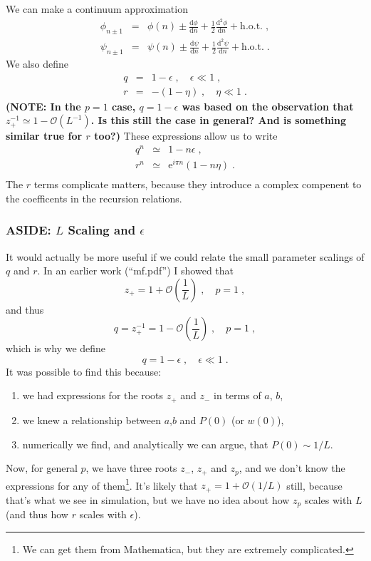 \documentclass[a4paper,10pt]{article}
\newcommand{\D}{\mathrm{d}}
\newcommand{\e}{\mathrm{e}}
\newcommand{\Or}{\mathcal{O}}
\begin{document}
We can make a continuum approximation
\begin{eqnarray}
 \phi_{n\pm1} &=& \phi(n) \pm \frac{ \D \phi}{\D n} + \frac{1}{2} \frac{\D^2 \phi}{\D n} + \mbox{h.o.t.}\;, \\
 \psi_{n\pm1} &=& \psi(n) \pm \frac{ \D \psi}{\D n} + \frac{1}{2} \frac{\D^2 \psi}{\D n} + \mbox{h.o.t.}\;.
\end{eqnarray}
We also define
\begin{eqnarray}
 q &=& 1 -\epsilon \;, \quad \epsilon \ll 1 \;, \\
 r &=& -(1 - \eta) \;, \quad \eta \ll 1 \;.
\end{eqnarray}
{\bf (NOTE: In the $p=1$ case, $q = 1 -\epsilon$ was based on the observation that $z_+^{-1} \simeq 1 - \Or(L^{-1})$. Is this still the case in general? And is something similar true for $r$ too?)} These expressions allow us to write
\begin{eqnarray}
 q^n &\simeq& 1 -n \epsilon \;, \\
 r^n &\simeq& \e^{i\pi n}(1 -n \eta) \;. \\
\end{eqnarray}
The $r$ terms complicate matters, because they introduce a complex compenent to the coefficents in the recursion relations.

\subsubsection{ASIDE: $L$ Scaling and $\epsilon$}

It would actually be more useful if we could relate the small parameter scalings of $q$ and $r$. In an earlier work (``mf.pdf'') I showed that
\begin{equation*}
 z_+ = 1 + \Or\left(\frac{1}{L}\right) \;, \quad p = 1 \;, 
\end{equation*}
and thus 
\begin{equation*}
 q = z_+^{-1} = 1 - \Or\left(\frac{1}{L}\right) \;, \quad p = 1 \;, 
\end{equation*}
which is why we define
\begin{equation*}
 q = 1 - \epsilon \;, \quad \epsilon \ll 1 \;. 
\end{equation*}
It was possible to find this because:
\begin{enumerate}
 \item we had expressions for the roots $z_+$ and $z_-$ in terms of $a$,  $b$,
 \item we knew a relationship between $a$,$b$ and $P(0)$ (or $w(0)$), 
 \item numerically we find, and analytically we can argue, that $P(0) \sim 1/L$. 
\end{enumerate}
Now, for general $p$, we have three roots $z_-$, $z_+$ and $z_p$, and we don't know the expressions for any of them\footnote{We can get them from Mathematica, but they are extremely complicated.}. It's likely that $z_+ = 1 + \Or(1/L)$ still, because that's what we see in simulation, but we have no idea about how $z_p$ scales with $L$ (and thus how $r$ scales with $\epsilon$).
\end{document}
